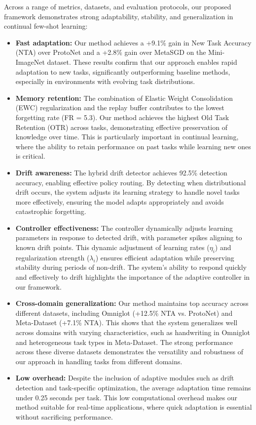 \documentclass[conference]{IEEEtran}
\begin{document}
Across a range of metrics, datasets, and evaluation protocols, our proposed framework demonstrates strong adaptability, stability, and generalization in continual few-shot learning:

\begin{itemize}
    \item \textbf{Fast adaptation:}  
    Our method achieves a +9.1\% gain in New Task Accuracy (NTA) over ProtoNet and a +2.8\% gain over MetaSGD on the Mini-ImageNet dataset. These results confirm that our approach enables rapid adaptation to new tasks, significantly outperforming baseline methods, especially in environments with evolving task distributions.
    
    \item \textbf{Memory retention:}  
    The combination of Elastic Weight Consolidation (EWC) regularization and the replay buffer contributes to the lowest forgetting rate (FR = 5.3). Our method achieves the highest Old Task Retention (OTR) across tasks, demonstrating effective preservation of knowledge over time. This is particularly important in continual learning, where the ability to retain performance on past tasks while learning new ones is critical.
    
    \item \textbf{Drift awareness:}  
    The hybrid drift detector achieves 92.5\% detection accuracy, enabling effective policy routing. By detecting when distributional drift occurs, the system adjusts its learning strategy to handle novel tasks more effectively, ensuring the model adapts appropriately and avoids catastrophic forgetting.
    
    \item \textbf{Controller effectiveness:}  
    The controller dynamically adjusts learning parameters in response to detected drift, with parameter spikes aligning to known drift points. This dynamic adjustment of learning rates ($\eta_i$) and regularization strength ($\lambda_i$) ensures efficient adaptation while preserving stability during periods of non-drift. The system's ability to respond quickly and effectively to drift highlights the importance of the adaptive controller in our framework.
    
    \item \textbf{Cross-domain generalization:}  
    Our method maintains top accuracy across different datasets, including Omniglot (+12.5\% NTA vs. ProtoNet) and Meta-Dataset (+7.1\% NTA). This shows that the system generalizes well across domains with varying characteristics, such as handwriting in Omniglot and heterogeneous task types in Meta-Dataset. The strong performance across these diverse datasets demonstrates the versatility and robustness of our approach in handling tasks from different domains.
    
    \item \textbf{Low overhead:}  
    Despite the inclusion of adaptive modules such as drift detection and task-specific optimization, the average adaptation time remains under 0.25 seconds per task. This low computational overhead makes our method suitable for real-time applications, where quick adaptation is essential without sacrificing performance.
\end{itemize}
\end{document}

